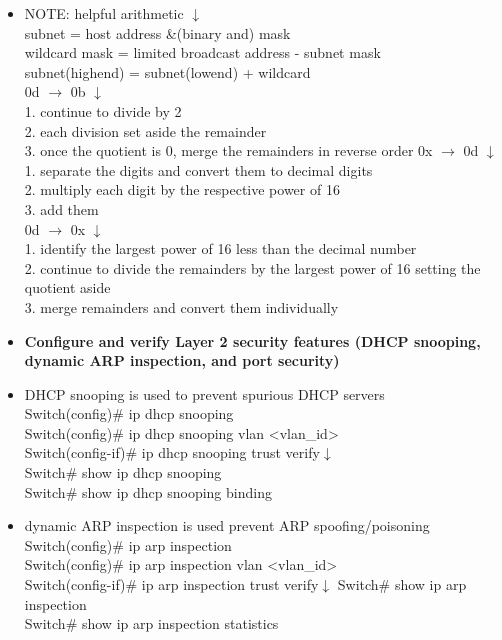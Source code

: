\documentclass{article}
\begin{document}
\begin{itemize}
  		
  	\item[] NOTE: helpful arithmetic $\downarrow$\\
  		subnet = host address \&(binary and) mask\\ 
  		wildcard mask = limited broadcast address - subnet mask\\
  		subnet(highend) = subnet(lowend) + wildcard\\
  		0d $\rightarrow$ 0b $\downarrow$\\
  		1. continue to divide by 2\\
  		2. each division set aside the remainder\\
  		3. once the quotient is 0, merge the remainders in reverse order
  		0x $\rightarrow$ 0d $\downarrow$\\
  		1. separate the digits and convert them to decimal digits\\
  		2. multiply each digit by the respective power of 16\\
  		3. add them\\
  		0d $\rightarrow$ 0x $\downarrow$\\
  		1. identify the largest power of 16 less than the decimal number\\
  		2. continue to divide the remainders by the largest power of 16 setting the quotient aside\\
  		3. merge remainders and convert them individually
  		
  \item \textbf{Configure and verify Layer 2 security features (DHCP snooping, dynamic ARP inspection, and port security)}
  	\item[] DHCP snooping is used to prevent spurious DHCP servers\\
  		Switch(config)\# ip dhcp snooping\\
		Switch(config)\# ip dhcp snooping vlan \textless vlan\_id\textgreater\\
		Switch(config-if)\# ip dhcp snooping trust
		verify$\downarrow$\\
		Switch\# show ip dhcp snooping\\
		Switch\# show ip dhcp snooping binding
  	\item[] dynamic ARP inspection is used prevent ARP spoofing/poisoning\\
  		Switch(config)\# ip arp inspection\\
		Switch(config)\# ip arp inspection vlan \textless vlan\_id\textgreater\\
		Switch(config-if)\# ip arp inspection trust
		verify$\downarrow$
		Switch\# show ip arp inspection\\
		Switch\# show ip arp inspection statistics\\
		

\end{itemize}
\end{document}
